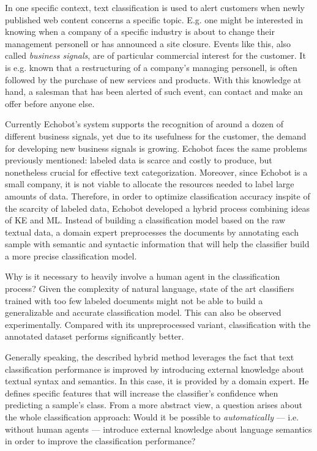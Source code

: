In one specific context, text classification is used to alert customers when
newly published web content concerns a specific topic. E.g. one might
be interested in knowing when a company of a specific industry is about to change
their management personell or has announced a site closure. 
Events like this, also called \textit{business signals}, are of particular
commercial interest for the customer. It is e.g. known that a restructuring 
of a company's managing personell, is often followed by the purchase of new
services and products. With this knowledge at hand, a salesman that has been
alerted of such event, can contact and make an offer before anyone else.

Currently Echobot's system supports the recognition of around a dozen of 
different business signals, yet due to its usefulness for the customer, the
demand for developing new business signals is growing. 
Echobot faces the same problems previously mentioned: labeled data is scarce and
costly to produce, but nonetheless crucial for effective text categorization.
Moreover, since Echobot is a small company, it is not viable to allocate the 
resources needed to label large amounts of data. Therefore, in order to optimize
classification accuracy inspite of the scarcity of labeled data, Echobot developed 
a hybrid process combining ideas of KE and ML. Instead of building a
classification model based on the raw textual data, a domain expert
preprocesses the documents by annotating each sample with semantic and
syntactic information that will help the classifier build a more precise
classification model.

Why is it necessary to heavily involve a human agent in the classification
process? Given the complexity of natural language, state of the art
classifiers trained with too few labeled documents might not be able to build a
generalizable and accurate classification model. This can also be observed
experimentally. Compared with its unpreprocessed variant, classification
with the annotated dataset performs significantly better.

Generally speaking, the described hybrid method leverages the fact that text
classification performance is improved by introducing external knowledge
about textual syntax and semantics. In this case, it is provided by a domain expert.
He defines specific features that will increase the classifier's confidence when
predicting a sample's class.
From a more abstract view, a question arises about the whole classification
approach: Would it be possible to \textit{automatically} --- i.e. without human
agents --- introduce external knowledge about language semantics in order to
improve the classification performance?  

